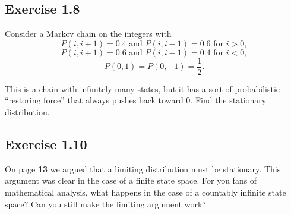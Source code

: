 \documentclass{article}
\begin{document}
    \subsection*{Exercise 1.8} Consider a Markov chain on the integers with
\[
P(i, i+1) = 0.4 \text{ and } P(i, i-1) = 0.6 \text{ for } i > 0,
\]
\[
P(i, i+1) = 0.6 \text{ and } P(i, i-1) = 0.4 \text{ for } i < 0,
\]
\[
P(0,1) = P(0,-1) = \frac{1}{2}.
\]

This is a chain with infinitely many states, but it has a sort of probabilistic ``restoring force'' that always pushes back toward 0. Find the stationary distribution.

\textcolor{blue}{}


\subsection*{Exercise 1.10} On page \textbf{13} we argued that a limiting distribution must be stationary. This argument was clear in the case of a finite state space. For you fans of mathematical analysis, what happens in the case of a countably infinite state space? Can you still make the limiting argument work?

\textcolor{blue}{}
\end{document}
